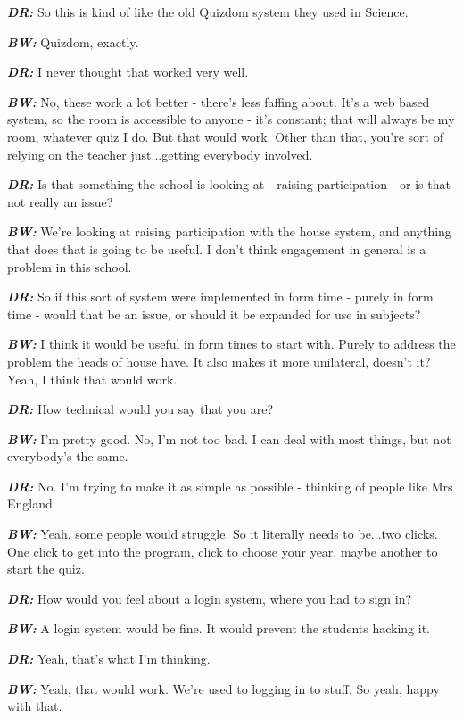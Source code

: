 \textit{\textbf{DR:}} So this is kind of like the old Quizdom system they used in Science.

\textit{\textbf{BW:}} Quizdom, exactly.

\textit{\textbf{DR:}} I never thought that worked very well.
 
\textit{\textbf{BW:}} No, these work a lot better - there's less faffing about. It's a web based system, so the room is accessible to anyone - it's constant; that will always be my room, whatever quiz I do. But that would work. Other than that, you're sort of relying on the teacher just...getting everybody involved.

\textit{\textbf{DR:}} Is that something the school is looking at - raising participation - or is that not really an issue?

\textit{\textbf{BW:}} We're looking at raising participation with the house system, and anything that does that is going to be useful. I don't think engagement in general is a problem in this school.

\textit{\textbf{DR:}} So if this sort of system were implemented in form time - purely in form time - would that be an issue, or should it be expanded for use in subjects?

\textit{\textbf{BW:}} I think it would be useful in form times to start with. Purely to address the problem the heads of house have. It also makes it more unilateral, doesn't it? Yeah, I think that would work.

\textit{\textbf{DR:}} How technical would you say that you are?

\textit{\textbf{BW:}} I'm pretty good. No, I'm not too bad. I can deal with most things, but not everybody's the same.

\textit{\textbf{DR:}} No. I'm trying to make it as simple as possible - thinking of people like Mrs England.

\textit{\textbf{BW:}} Yeah, some people would struggle. So it literally needs to be...two clicks. One click to get into the program, click to choose your year, maybe another to start the quiz.

\textit{\textbf{DR:}} How would you feel about a login system, where you had to sign in?

\textit{\textbf{BW:}} A login system would be fine. It would prevent the students hacking it.

\textit{\textbf{DR:}} Yeah, that's what I'm thinking.

\textit{\textbf{BW:}} Yeah, that would work. We're used to logging in to stuff. So yeah, happy with that.

